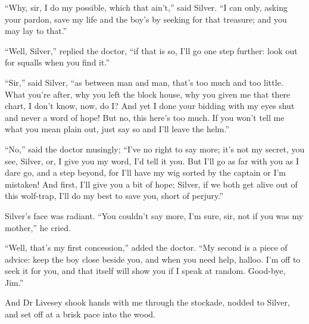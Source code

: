 \enquote{Why, sir, I do my possible, which that ain’t,} said Silver. \enquote{I can only, asking your pardon, save my life and the boy’s by seeking for that treasure; and you may lay to that.}

\enquote{Well, Silver,} replied the doctor, \enquote{if that is so, I’ll go one step further: look out for squalls when you find it.}

\enquote{Sir,} said Silver, \enquote{as between man and man, that’s too much and too little. What you’re after, why you left the block house, why you given me that there chart, I don’t know, now, do I? And yet I done your bidding with my eyes shut and never a word of hope! But no, this here’s too much. If you won’t tell me what you mean plain out, just say so and I’ll leave the helm.}

\enquote{No,} said the doctor musingly; \enquote{I’ve no right to say more; it’s not my secret, you see, Silver, or, I give you my word, I’d tell it you. But I’ll go as far with you as I dare go, and a step beyond, for I’ll have my wig sorted by the captain or I’m mistaken! And first, I’ll give you a bit of hope; Silver, if we both get alive out of this wolf-trap, I’ll do my best to save you, short of perjury.}

Silver’s face was radiant. \enquote{You couldn’t say more, I’m sure, sir, not if you was my mother,} he cried.

\enquote{Well, that’s my first concession,} added the doctor. \enquote{My second is a piece of advice: keep the boy close beside you, and when you need help, halloo. I’m off to seek it for you, and that itself will show you if I speak at random. Good-bye, Jim.}

And Dr Livesey shook hands with me through the stockade, nodded to Silver, and set off at a brisk pace into the wood.